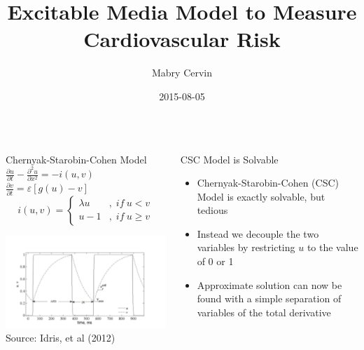 \documentclass[final,hyperref={pdfpagelabels=false}]{beamer}
\title[Heart Model Poster]{Excitable Media Model to Measure Cardiovascular Risk}
\author[Cervin]{Mabry Cervin}
\institute[UNCG]{University of North Carolina Greensboro}
\date{2015-08-05}
\begin{document}
  \begin{frame}{} 
    \begin{columns}
      \begin{column}{.48\linewidth}
        \begin{block}{Chernyak-Starobin-Cohen Model}
            \centering
            \(\frac{\partial u}{\partial t} - \frac{\partial^2u}{\partial x^2}=-i(u,v)\)  \\
            \(\frac{\partial v}{\partial t} = \varepsilon [g(u)-v]\) \\
            \begin{displaymath}
                i(u, v) = \left\{
                    \begin{array}{lr}
                        \lambda u & , \; if \: u < v\\
                        u - 1 & , \; if \: u \geq v
                    \end{array}
                \right.
            \end{displaymath}
        \end{block}

        \begin{block}{}
            \centering
            \includegraphics[width=.7\linewidth]{figure1.pdf} \\
            Source: Idris, et al (2012)
        \end{block}
      \end{column}
      \begin{column}{.48\linewidth}
        \begin{block}{CSC Model is Solvable}
            \begin{itemize}
                \item Chernyak-Starobin-Cohen (CSC) Model is exactly solvable, but tedious
                \item Instead we decouple the two variables by restricting \(u\) to the value of 0 or 1
                \item Approximate solution can now be found with a simple separation of variables of the total derivative
            \end{itemize}
        \end{block}


\end{column}
\end{columns}
\end{frame}
\end{document}
